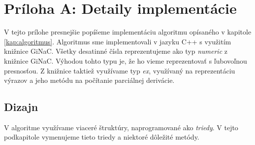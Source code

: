 \chapter*{Príloha A: Detaily implementácie}

V tejto prílohe presnejšie popíšeme implementáciu algoritmu opísaného v kapitole \ref{kap:algoritmus}.
Algoritmus sme implementovali v jazyku C++ s využitím knižnice GiNaC. Všetky desatinné čísla
reprezentujeme ako typ \textit{numeric} z knižnice GiNaC. Výhodou tohto typu je, že ho vieme 
reprezentovať s ľubovoľnou presnosťou. Z knižnice taktiež využívame typ \textit{ex}, využívaný na 
reprezentáciu výrazov a jeho metódu na počítanie parciálnej derivácie.

\section{Dizajn}

V algoritme využívame viaceré štruktúry, naprogramované ako \textit{triedy}. V tejto podkapitole
vymenujeme tieto triedy a niektoré dôležité metódy.

